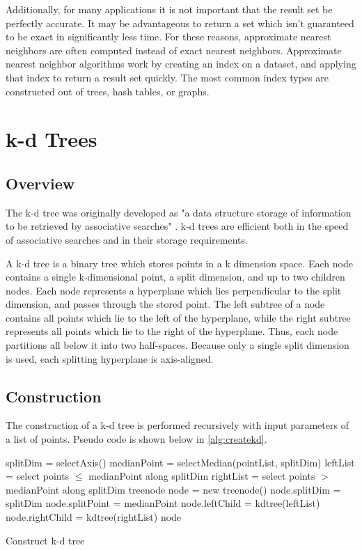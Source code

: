 Additionally, for many applications it is not important that the result set be perfectly accurate.  It may be advantageous to return a set which isn't guaranteed to be exact in significantly less time. For these reasons, approximate nearest neighbors are often computed instead of exact nearest neighbors.  Approximate nearest neighbor algorithms work by creating an index on a dataset, and applying that index to return a result set quickly.  The most common index types are constructed out of trees, hash tables, or graphs.

\section{k-d Trees}
\label{sec:kdtree}

\subsection{Overview}
The k-d tree was originally developed as "a data structure storage of information to be retrieved by associative searches" \citep{bentley1975multidimensional}. k-d trees are efficient both in the speed of associative searches and in their storage requirements.

A k-d tree is a binary tree which stores points in a k dimension space.  Each node contains a single k-dimensional point, a split dimension, and up to two children nodes.  Each node represents a hyperplane which lies perpendicular to the split dimension, and passes through the stored point.  The left subtree of a node contains all points which lie to the left of the hyperplane, while the right subtree represents all points which lie to the right of the hyperplane.  Thus, each node partitions all below it into two half-spaces.  Because only a single split dimension is used, each splitting hyperplane is axis-aligned.

\subsection{Construction}

The construction of a k-d tree is performed recursively with input parameters of a list of points.  Pseudo code is shown below in \ref{alg:createkd}.  

\begin{algorithm}
\begin{algorithmic}
	\State splitDim = selectAxis()
	\State
	\State medianPoint = selectMedian(pointList, splitDim)
	\State leftList = select points $\leq$ medianPoint along splitDim
	\State rightList = select points $>$ medianPoint along splitDim
	\State
	\State treenode node = new treenode()
	\State node.splitDim = splitDim
	\State node.splitPoint = medianPoint
	\State node.leftChild = kdtree(leftList)
	\State node.rightChild = kdtree(rightList)
	\State
	\State \Return node
\EndFunction
\end{algorithmic}
\caption{Construct k-d tree}
\label{alg:createkd}
\end{algorithm}

